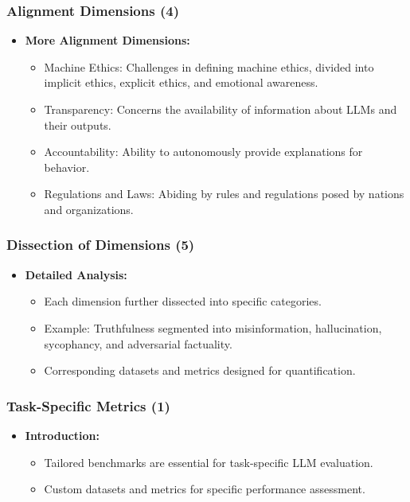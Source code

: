 \begin{frame}[fragile]\frametitle{Alignment Dimensions (4)}
  \begin{itemize}
    \item \textbf{More Alignment Dimensions:}
      \begin{itemize}
        \item Machine Ethics: Challenges in defining machine ethics, divided into implicit ethics, explicit ethics, and emotional awareness.
        \item Transparency: Concerns the availability of information about LLMs and their outputs.
        \item Accountability: Ability to autonomously provide explanations for behavior.
        \item Regulations and Laws: Abiding by rules and regulations posed by nations and organizations.
      \end{itemize}
  \end{itemize}
\end{frame}

\begin{frame}[fragile]\frametitle{Dissection of Dimensions (5)}
  \begin{itemize}
    \item \textbf{Detailed Analysis:}
      \begin{itemize}
        \item Each dimension further dissected into specific categories.
        \item Example: Truthfulness segmented into misinformation, hallucination, sycophancy, and adversarial factuality.
        \item Corresponding datasets and metrics designed for quantification.
      \end{itemize}
  \end{itemize}
\end{frame}

\begin{frame}[fragile]\frametitle{Task-Specific Metrics (1)}
  \begin{itemize}
    \item \textbf{Introduction:}
      \begin{itemize}
        \item Tailored benchmarks are essential for task-specific LLM evaluation.
        \item Custom datasets and metrics for specific performance assessment.
      \end{itemize}
  \end{itemize}
\end{frame}

